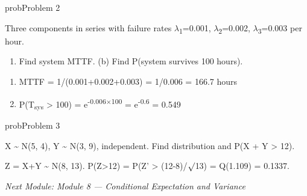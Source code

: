 \begin{PSbox}[unbreakable]{prob}{Problem 2}

Three components in series with failure rates \ensuremath{\lambda}\textsubscript{1}=0.001, \ensuremath{\lambda}\textsubscript{2}=0.002, \ensuremath{\lambda}\textsubscript{3}=0.003 per hour.

\begin{enumerate}
\def\labelenumi{(\alph{enumi})}
\tightlist
\item
  Find system MTTF. (b) Find P(system survives 100 hours).
\end{enumerate}

\PSsolution{} 

\begin{enumerate}
\def\labelenumi{(\alph{enumi})}
\tightlist
\item
  MTTF = 1/(0.001+0.002+0.003) = 1/0.006 = 166.7 hours
\item
  P(T\textsubscript{sys} \textgreater{} 100) = e\textsuperscript{-0.006\ensuremath{\times}100} = e\textsuperscript{-0.6} = 0.549
\end{enumerate}

\end{PSbox}

\begin{PSbox}[unbreakable]{prob}{Problem 3}

X \textasciitilde{} N(5, 4), Y \textasciitilde{} N(3, 9), independent. Find distribution and P(X + Y \textgreater{} 12).

\PSsolution{} Z = X+Y \textasciitilde{} N(8, 13). P(Z\textgreater{}12) = P(Z’ \textgreater{} (12-8)/\ensuremath{\surd}13) = Q(1.109) = 0.1337.

\emph{Next Module: {Module 8 — Conditional Expectation and Variance}}

\end{PSbox}
